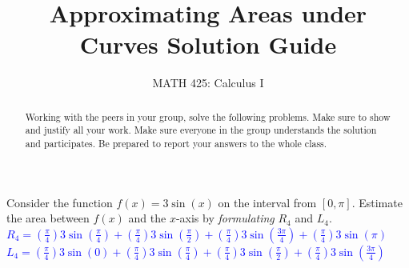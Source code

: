 \documentclass{ximera}
\title{Approximating Areas under Curves Solution Guide}
\author{MATH 425: Calculus I}
\begin{document}
\begin{abstract}
   Working with the peers in your group, solve the following problems. Make sure to show and justify all your work. Make sure everyone in the group understands the solution and participates. Be prepared to report your answers to the whole class. 
\end{abstract}
\maketitle


\begin{exercise}
    Consider the function $f(x)=3\sin(x)$ on the interval from $[0,\pi]$.  Estimate the area between $f(x)$ and the $x$-axis by \textit{formulating} $R_4$ and $L_4$.\\
    \textcolor{blue}{$R_4=(\frac{\pi}{4})3\sin(\frac{\pi}{4})+(\frac{\pi}{4})3\sin(\frac{\pi}{2})+(\frac{\pi}{4})3\sin(\frac{3\pi}{4})+(\frac{\pi}{4})3\sin(\pi)$\\%
    $L_4=(\frac{\pi}{4})3\sin(0)+(\frac{\pi}{4})3\sin(\frac{\pi}{4})+(\frac{\pi}{4})3\sin(\frac{\pi}{2})+(\frac{\pi}{4})3\sin(\frac{3\pi}{4})$\\}%
\end{exercise}
\end{document}
